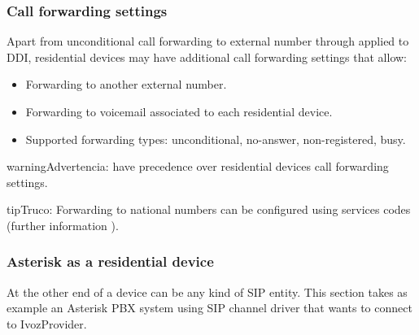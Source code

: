 \documentclass[letterpaper,10pt,spanish]{sphinxmanual}
\begin{document}
\subsubsection{Call forwarding settings}
\label{administration_portal/client/residential/residential_devices:residential-devices-cfw}\label{administration_portal/client/residential/residential_devices:call-forwarding-settings}
Apart from unconditional call forwarding to external number through {\hyperref[administration_portal/client/vpbx/routing_tools/external_call_filters:external\string-call\string-filters]{}} applied to DDI,
residential devices may have additional call forwarding settings that allow:
\begin{itemize}
\item {} 
Forwarding to another external number.

\item {} 
Forwarding to voicemail associated to each residential device.

\item {} 
Supported forwarding types: unconditional, no-answer, non-registered, busy.

\end{itemize}

\begin{notice}{warning}{Advertencia:}
{\hyperref[administration_portal/client/vpbx/routing_tools/external_call_filters:external\string-call\string-filters]{}} have precedence over residential devices call forwarding settings.
\end{notice}

\begin{notice}{tip}{Truco:}
Forwarding to national numbers can be configured using services codes
(further information {\hyperref[administration_portal/brand/settings/generic_services:call\string-forward\string-services]{}}).
\end{notice}


\subsubsection{Asterisk as a residential device}
\label{administration_portal/client/residential/residential_devices:asterisk-as-a-residential-device}
At the other end of a device can be any kind of SIP entity. This section takes
as example an Asterisk PBX system using SIP channel driver that wants to connect
to IvozProvider.
\end{document}
